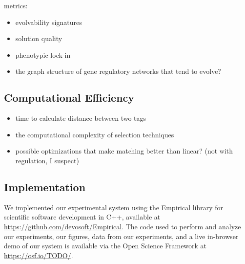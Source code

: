 metrics:
\begin{itemize}
\item evolvability signatures \citep{tarapore2015evolvability}
\item solution quality
\item phenotypic lock-in
\item the graph structure of gene regulatory networks that tend to evolve?
\end{itemize}

\subsection{Computational Efficiency}

\begin{itemize}
\item time to calculate distance between two tags
\item the computational complexity of selection techniques
\item possible optimizations that make matching better than linear?
(not with regulation, I suspect)
\end{itemize}

\subsection{Implementation}

We implemented our experimental system using the Empirical library for scientific software development in C++, available at \url{https://github.com/devosoft/Empirical}.
The code used to perform and analyze our experiments, our figures, data from our experiments, and a live in-browser demo of our system is available via the Open Science Framework at \url{https://osf.io/TODO/}.
